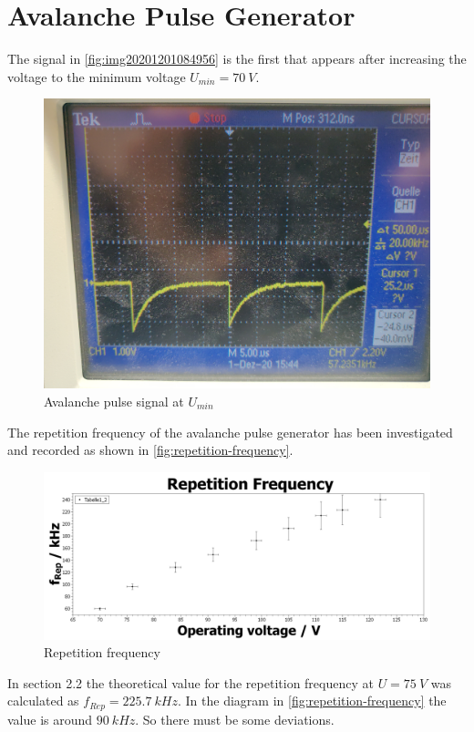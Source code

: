 \section{Avalanche Pulse Generator}
The signal in \vref{fig:img20201201084956} is the first that appears after increasing the voltage to the minimum voltage $ U_{min}=\SI{70}{V} $.
\begin{figure}[H]
 \centering
 \includegraphics[width=0.7\linewidth]{messdaten/IMG_20201201_084956}
 \caption[Avalanche pulse signal at $ U_{min} $]{Avalanche pulse signal at $ U_{min} $}
 \label{fig:img20201201084956}
\end{figure}
The repetition frequency of the avalanche pulse generator has been investigated and recorded as shown in \vref{fig:repetition-frequency}.
\begin{figure}[H]
 \centering
 \includegraphics[width=1\linewidth]{messdaten/Repetition Frequency}
 \caption[Repetition frequency]{Repetition frequency}
 \label{fig:repetition-frequency}
\end{figure}
In section 2.2 the theoretical value for the repetition frequency at $ U=\SI{75}{V} $ was calculated as $ f_{Rep}=\SI{225.7}{kHz} $. In the diagram in \vref{fig:repetition-frequency} the value is around $ \SI{90}{kHz} $. So there must be some deviations.\\\\
